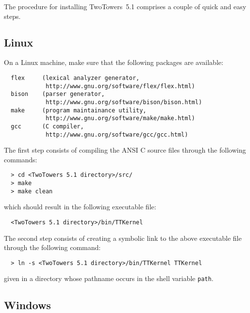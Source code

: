 The procedure for installing TwoTowers~5.1 comprises a couple of quick and easy steps.


\subsection{Linux}

On a Linux machine, make sure that the following packages are available:

	\begin{verbatim}
  flex     (lexical analyzer generator,
            http://www.gnu.org/software/flex/flex.html)
  bison    (parser generator,
            http://www.gnu.org/software/bison/bison.html)
  make     (program maintainance utility,
            http://www.gnu.org/software/make/make.html)
  gcc      (C compiler,
            http://www.gnu.org/software/gcc/gcc.html)
	\end{verbatim}

\noindent
The first step consists of compiling the ANSI C source files through the following commands:

	\begin{verbatim}
  > cd <TwoTowers 5.1 directory>/src/
  > make
  > make clean
	\end{verbatim}

\noindent
which should result in the following executable file:

	\begin{verbatim}
  <TwoTowers 5.1 directory>/bin/TTKernel
	\end{verbatim}

\noindent
The second step consists of creating a symbolic link to the above executable file through the following
command:

	\begin{verbatim}
  > ln -s <TwoTowers 5.1 directory>/bin/TTKernel TTKernel
	\end{verbatim}

\noindent
given in a directory whose pathname occurs in the shell variable {\tt path}.


\subsection{Windows}

